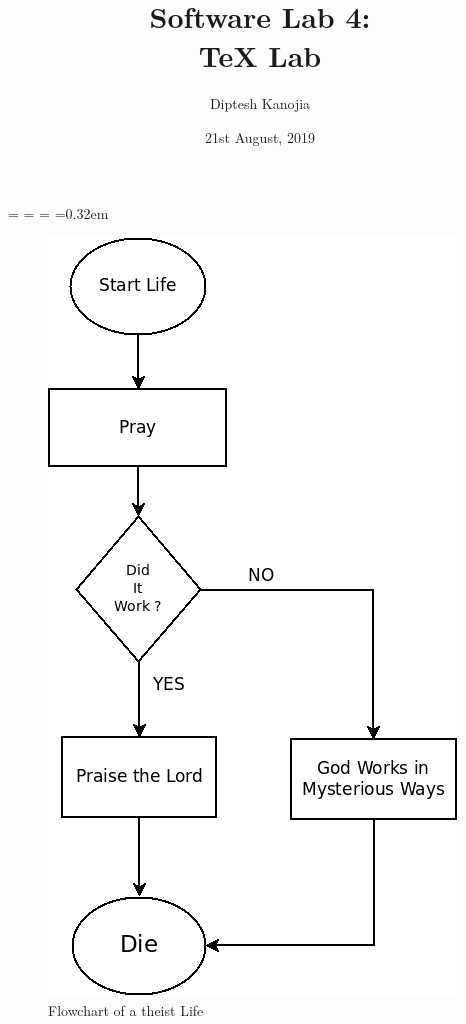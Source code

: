 \documentclass[a4paper,12pt]{extarticle}
\title{{\Huge \textbf{Software Lab 4: \\ \vspace{0.20cm} TeX Lab\vspace{0.5cm}}}}
\author{\LARGE{Diptesh Kanojia \vspace{0.3cm}}}
\date{\Large{21st August, 2019}}
\begin{document}
  \newdimen\origiwspc%
  \newdimen\origiwstr%
  \origiwspc=\font%
  \origiwstr=\font%
\font=\origiwstr%
  \font=0.32em%
\normalfont
\begin{titlingpage}
\maketitle

\end{titlingpage}
\newpage
\vspace*{0.5cm}
\begin{figure}[h!]
	\centering
	\includegraphics[scale=0.5]{LifePray}
	\vspace{-0.15 cm}
	{\large{\caption{Flowchart of a theist Life}
	\label{fig:lifepray}}}
\end{figure}
\end{document}

